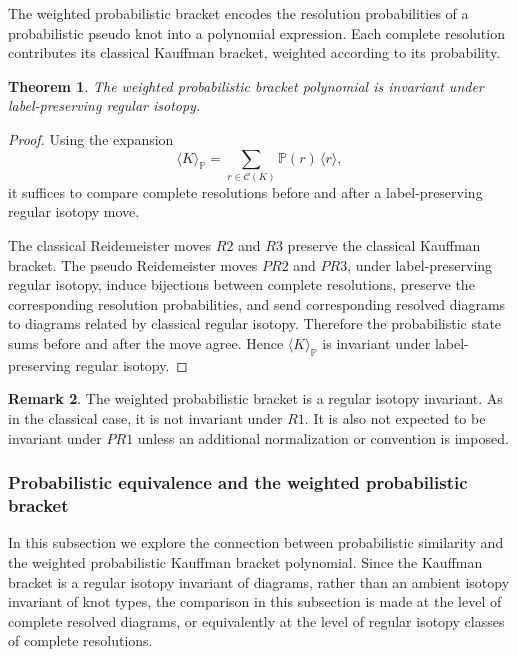 \documentclass[a4paper, reqno, 12pt]{amsart}
\theoremstyle{plain}
\newtheorem{theorem}{Theorem}[section]
\theoremstyle{definition}
\newtheorem{remark}[theorem]{Remark}
\begin{document}
The weighted probabilistic bracket encodes the resolution probabilities of a probabilistic pseudo knot into a polynomial expression. Each complete resolution contributes its classical Kauffman bracket, weighted according to its probability.

\begin{theorem}\label{wbk}
The weighted probabilistic bracket polynomial is invariant under label-preserving regular isotopy.
\end{theorem}

\begin{proof}
Using the expansion
\[
\langle K\rangle_{\mathbb P}
=
\sum_{r\in\mathcal C(K)}
\mathbb P(r)\,\langle r\rangle,
\]
it suffices to compare complete resolutions before and after a label-preserving regular isotopy move.

The classical Reidemeister moves \(R2\) and \(R3\) preserve the classical Kauffman bracket. The pseudo Reidemeister moves \(PR2\) and \(PR3\), under label-preserving regular isotopy, induce bijections between complete resolutions, preserve the corresponding resolution probabilities, and send corresponding resolved diagrams to diagrams related by classical regular isotopy. Therefore the probabilistic state sums before and after the move agree. Hence \(\langle K\rangle_{\mathbb P}\) is invariant under label-preserving regular isotopy.
\end{proof}

\begin{remark}\rm
The weighted probabilistic bracket is a regular isotopy invariant. As in the classical case, it is not invariant under \(R1\). It is also not expected to be invariant under \(PR1\) unless an additional normalization or convention is imposed.
\end{remark}







\subsubsection{Probabilistic equivalence and the weighted probabilistic bracket}

In this subsection we explore the connection between probabilistic similarity and the weighted probabilistic Kauffman bracket polynomial. Since the Kauffman bracket is a regular isotopy invariant of diagrams, rather than an ambient isotopy invariant of knot types, the comparison in this subsection is made at the level of complete resolved diagrams, or equivalently at the level of regular isotopy classes of complete resolutions.
\end{document}
